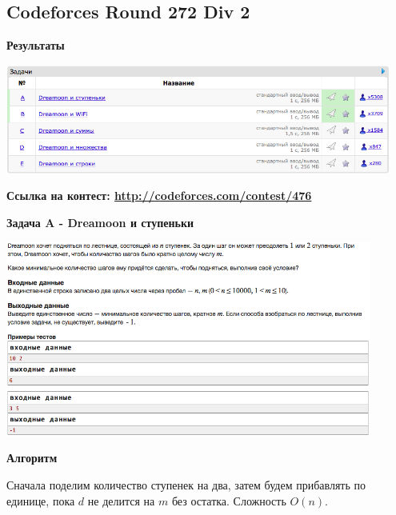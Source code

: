 \documentclass[a4paper,12pt]{article}
\begin{document}
%
%

\newpage
\subsection{Codeforces Round 272 Div 2}


\textbf{{\large Результаты}} \\
\begin{center}
\includegraphics[width=0.95\textwidth]{C_272/A_C_272_result.png}\\ [1cm]
\end{center}

\textbf{{\large Ссылка на контест: \url{http://codeforces.com/contest/476}}}

\newpage
\textbf{{\large Задача A - Dreamoon и ступеньки}} \\
\begin{center}
\includegraphics[width=0.9\textwidth]{C_272/C_272_A.png}\\ [1cm]
\end{center}

\textbf{{\large Алгоритм}}

Сначала поделим количество ступенек на два, затем будем прибавлять по единице, пока $d$ не делится на $m$ без остатка. Сложность $O(n)$. \\
\end{document}
